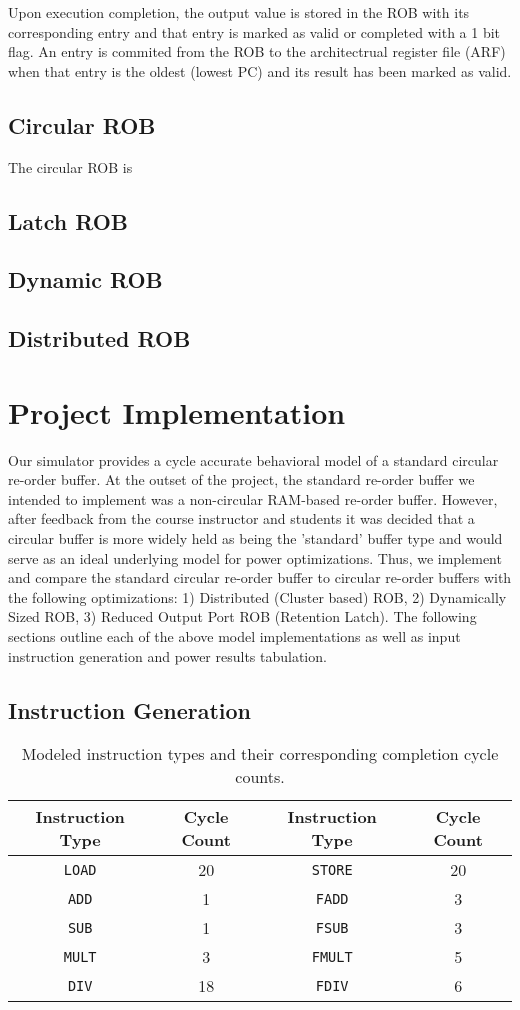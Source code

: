 \documentclass{acm_proc_article-sp}
\begin{document}
Upon execution completion, the output value is stored in the ROB with its 
corresponding entry and that entry is marked as valid or completed with a 
1 bit flag.  An entry is commited from the ROB to the architectrual register
file (ARF) when that entry is the oldest (lowest PC) and its result has been 
marked as valid. 
\subsection{Circular ROB}
The circular ROB is 
\subsection{Latch ROB}
\subsection{Dynamic ROB}
\subsection{Distributed ROB}

\section{Project Implementation}
Our simulator provides a cycle accurate behavioral model of a standard circular re-order buffer.  At the outset of the project, the standard re-order buffer we intended to implement was a non-circular RAM-based re-order buffer.  However, after feedback from the course instructor and students it was decided that a circular buffer is more widely held as being the 'standard' buffer type and would serve as an ideal underlying model for power optimizations.  Thus, we implement and compare the standard circular re-order buffer to circular re-order buffers with the following optimizations: 1) Distributed (Cluster based) ROB, 2) Dynamically Sized ROB, 3) Reduced Output Port ROB (Retention Latch). The following sections outline each of the above model implementations as well as input instruction generation and power results tabulation.  
\subsection{Instruction Generation}

\begin{table*}
\centering
\begin{tabular}{|c|c|c|c|} \hline
Instruction Type&Cycle Count&Instruction Type&Cycle Count\\ \hline
\texttt{LOAD}&20&\texttt{STORE}&20\\ \hline
\texttt{ADD}&1&\texttt{FADD}&3\\ \hline
\texttt{SUB}&1&\texttt{FSUB}&3\\ \hline
\texttt{MULT}&3&\texttt{FMULT}&5\\ \hline
\texttt{DIV}&18&\texttt{FDIV}&6\\ \hline\end{tabular}
\caption{Modeled instruction types and their corresponding completion cycle counts.}
\label{tab:instypetable}
\end{table*}
\end{document}
